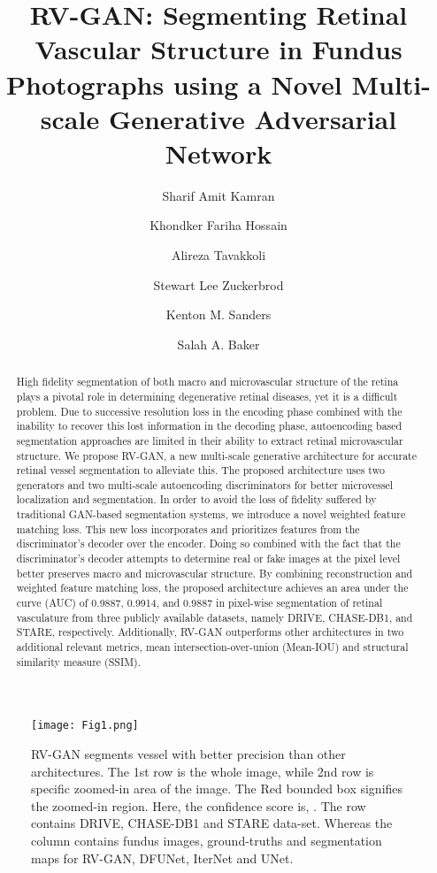 \documentclass[runningheads]{llncs}
\begin{document}
\title{RV-GAN: Segmenting Retinal Vascular Structure in Fundus Photographs using a Novel Multi-scale Generative Adversarial Network}
\author{Sharif Amit Kamran \and
Khondker Fariha Hossain \and
Alireza Tavakkoli \and 
Stewart Lee Zuckerbrod \and 
Kenton M. Sanders \and 
Salah A. Baker}
\maketitle              \begin{abstract}
High fidelity segmentation of both macro and microvascular structure of the retina plays a pivotal role in determining degenerative retinal diseases, yet it is a difficult problem. Due to successive resolution loss in the encoding phase combined with the inability to recover this lost information in the decoding phase, autoencoding based segmentation approaches are limited in their ability to extract retinal microvascular structure. We propose RV-GAN, a new multi-scale generative architecture for accurate retinal vessel segmentation to alleviate this. The proposed architecture uses two generators and two multi-scale autoencoding discriminators for better microvessel localization and segmentation. In order to avoid the loss of fidelity suffered by traditional GAN-based segmentation systems, we introduce a novel weighted feature matching loss. This new loss incorporates and prioritizes features from the discriminator's decoder over the encoder. Doing so combined with the fact that the discriminator's decoder attempts to determine real or fake images at the pixel level better preserves macro and microvascular structure. By combining reconstruction and weighted feature matching loss, the proposed architecture achieves an area under the curve (AUC)  of  0.9887,  0.9914,  and  0.9887 in pixel-wise segmentation of retinal vasculature from three publicly available datasets,  namely  DRIVE,  CHASE-DB1, and STARE, respectively.  Additionally, RV-GAN outperforms other architectures in two additional relevant metrics, mean intersection-over-union (Mean-IOU) and structural similarity measure (SSIM). 

\end{abstract}
\begin{figure}[t]
    \centering
    \texttt{[image: Fig1.png]}
    \caption{RV-GAN segments vessel with better precision than other architectures. The 1st row is the whole image, while 2nd row is specific zoomed-in area of the image. The Red bounded box signifies the zoomed-in region. Here, the confidence score is, .  The row contains DRIVE, CHASE-DB1 and STARE data-set. Whereas the column contains fundus images, ground-truths and segmentation maps for RV-GAN, DFUNet, IterNet and UNet. }
    \label{fig1}
\end{figure}
\end{document}
